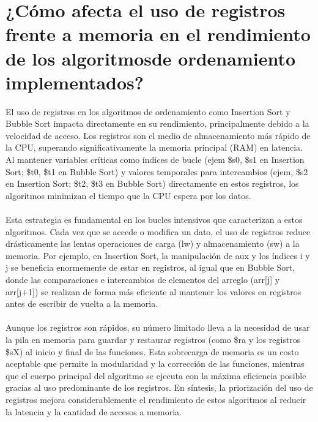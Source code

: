 \documentclass{article}
\begin{document}
\section{¿Cómo afecta el uso de registros frente a memoria en el rendimiento de los algoritmosde ordenamiento implementados?}
El uso de registros en los algoritmos de ordenamiento como Insertion Sort y Bubble Sort impacta directamente en su rendimiento, principalmente debido a la velocidad de acceso. Los registros son el medio de almacenamiento más rápido de la CPU, superando significativamente la memoria principal (RAM) en latencia. Al mantener variables críticas como índices de bucle (ejem \$s0, \$s1 en Insertion Sort; \$t0, \$t1 en Bubble Sort) y valores temporales para intercambios (ejem, \$s2 en Insertion Sort; \$t2, \$t3 en Bubble Sort) directamente en estos registros, los algoritmos minimizan el tiempo que la CPU espera por los datos.
\\
\\Esta estrategia es fundamental en los bucles intensivos que caracterizan a estos algoritmos. Cada vez que se accede o modifica un dato, el uso de registros reduce drásticamente las lentas operaciones de carga (lw) y almacenamiento (sw) a la memoria. Por ejemplo, en Insertion Sort, la manipulación de aux y los índices i y j se beneficia enormemente de estar en registros, al igual que en Bubble Sort, donde las comparaciones e intercambios de elementos del arreglo (arr[j] y arr[j+1]) se realizan de forma más eficiente al mantener los valores en registros antes de escribir de vuelta a la memoria.
\\
\\Aunque los registros son rápidos, su número limitado lleva a la necesidad de usar la pila en memoria para guardar y restaurar registros (como \$ra y los registros \$sX) al inicio y final de las funciones. Esta sobrecarga de memoria es un costo aceptable que permite la modularidad y la corrección de las funciones, mientras que el cuerpo principal del algoritmo se ejecuta con la máxima eficiencia posible gracias al uso predominante de los registros. En síntesis, la priorización del uso de registros mejora considerablemente el rendimiento de estos algoritmos al reducir la latencia y la cantidad de accesos a memoria.
\end{document}
